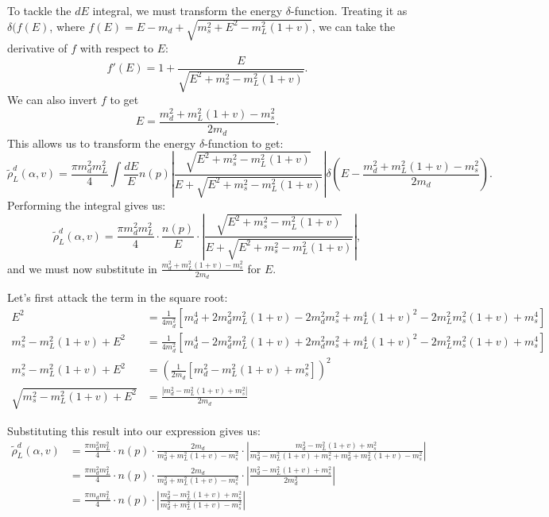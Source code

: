 \documentclass{article}
\begin{document}
  To tackle the $dE$ integral, we must transform the energy $\delta$-function. Treating it as $\delta(f(E)$, where
  $f(E) = E - m_d + \sqrt{m_s^2 + E^2 - m_L^2(1+v)}$, we can take the derivative of $f$ with respect to $E$:
  \begin{equation}
    f'(E) = 1 + \frac{E}{\sqrt{E^2 + m_s^2 - m_L^2(1+v)}}.
  \end{equation}
  We can also invert $f$ to get
  \begin{equation}
    E= \frac{m_d^2 + m_L^2(1+v) - m_s^2}{2m_d}. 
  \end{equation}
  This allows us to transform the energy $\delta$-function to get:
  \begin{equation}
    \tilde{\rho}_L^d(\alpha,v) = \frac{\pi m_d^2 m_L^2}{4} \int \frac{dE}{E} n(p) \left|
    \frac{\sqrt{E^2 + m_s^2 - m_L^2(1+v)}}{E+\sqrt{E^2 + m_s^2 - m_L^2(1+v)}} \right|
    \delta\left(E -\frac{m_d^2 + m_L^2(1+v) - m_s^2}{2m_d}\right).
  \end{equation}
  Performing the integral gives us:
  \begin{equation}
    \tilde{\rho}_L^d(\alpha,v) = \frac{\pi m_d^2 m_L^2}{4}\cdot \frac{n(p)}{E} \cdot \left|
    \frac{\sqrt{E^2 + m_s^2 - m_L^2(1+v)}}{E+\sqrt{E^2 + m_s^2 - m_L^2(1+v)}} \right|,
  \end{equation}
  and we must now substitute in $\frac{m_d^2 + m_L^2(1+v) - m_s^2}{2m_d}$ for $E$.

  Let's first attack the term in the square root:
  \begin{align}
    E^2 &= \frac{1}{4m_d^2} \left[
      m_d^4 + 2m_d^2m_L^2(1+v) - 2m_d^2m_s^2 + m_L^4(1+v)^2 - 2m_L^2m_s^2(1+v) +m_s^4\right] \\
    m_s^2 - m_L^2(1+v) + E^2 &= \frac{1}{4m_d^2} \left[
      m_d^4 - 2m_d^2m_L^2(1+v) + 2m_d^2m_s^2 + m_L^4(1+v)^2 - 2m_L^2m_s^2(1+v) +m_s^4\right] \\
    m_s^2 - m_L^2(1+v) + E^2 &= \left( \frac{1}{2m_d} \left[
      m_d^2 - m_L^2(1+v) + m_s^2\right]\right)^2\\
    \sqrt{m_s^2 - m_L^2(1+v) + E^2} &= \frac{\left| m_d^2 - m_L^2(1+v) + m_s^2\right|}{2m_d}
  \end{align}

  Substituting this result into our expression gives us:
  \begin{align}
    \tilde{\rho}_L^d(\alpha,v) &= \frac{\pi m_d^2 m_L^2}{4} \cdot n(p) \cdot \frac{2m_d}{m_d^2 + m_L^2(1+v) - m_s^2} \cdot
    \left|
    \frac{m_d^2 - m_L^2(1+v) + m_s^2}{m_d^2 - m_L^2(1+v) + m_s^2 + m_d^2 + m_L^2(1+v) - m_s^2} \right|\\
    &= \frac{\pi m_d^2 m_L^2}{4} \cdot n(p) \cdot \frac{2m_d}{m_d^2 + m_L^2(1+v) - m_s^2} \cdot
    \left|
    \frac{m_d^2 - m_L^2(1+v) + m_s^2}{2 m_d^2 } \right|\\
    &= \frac{\pi m_d m_L^2}{4} \cdot n(p) \cdot \left| \frac{m_d^2 - m_L^2(1+v) + m_s^2}{m_d^2 + m_L^2(1+v) - m_s^2} \right|   
  \end{align}
\end{document}
